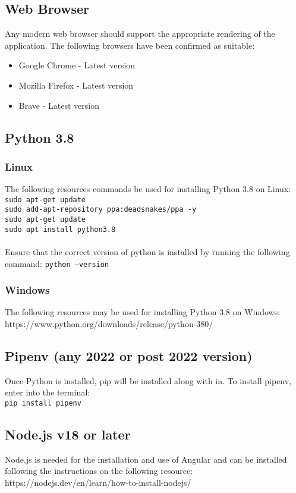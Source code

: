 \documentclass[12pt]{article}
\begin{document}
\subsection{Web Browser}
Any modern web browser should support the appropriate rendering of the application. The following browsers have been confirmed as suitable:
\begin{itemize}
    \item Google Chrome - Latest version
    \item Mozilla Firefox - Latest version
    \item Brave - Latest version
\end{itemize}

\subsection{Python 3.8}
\subsubsection{Linux}
The following resources commands be used for installing Python 3.8 on Linux:\\
\texttt{sudo apt-get update}\\
\texttt{sudo add-apt-repository ppa:deadsnakes/ppa -y}\\
\texttt{sudo apt-get update}\\
\texttt{sudo apt install python3.8}\\ \\
Ensure that the correct version of python is installed by running the following command:
\texttt{python --version}

\subsubsection{Windows}
The following resources may be used for installing Python 3.8 on Windows:\\
https://www.python.org/downloads/release/python-380/

\subsection{Pipenv (any 2022 or post 2022 version)}
Once Python is installed, pip will be installed along with in. To install pipenv, enter into the terminal:\\
\texttt{pip install pipenv}

\subsection{Node.js v18 or later}
Node.js is needed for the installation and use of Angular and can be installed
following the instructions on the following resource:\\
https://nodejs.dev/en/learn/how-to-install-nodejs/
\end{document}
